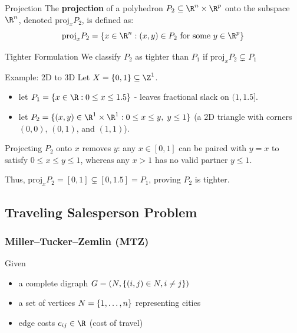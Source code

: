 \documentclass[a4paper, 11pt]{report}
\begin{document}
\begin{defframe}{Projection}{}
    The \textbf{projection} of a polyhedron $P_2 \subseteq \R^n \times \R^p$ onto the subspace $\R^n$, denoted $\text{proj}_x P_2$, is defined as:
    $$ \text{proj}_x P_2 = \{ x \in \R^n : (x,y) \in P_2 \text{ for some } y \in \R^p \} $$
\end{defframe}

\begin{defframe}{Tighter Formulation}{}
We classify $P_2$ as tighter than $P_1$ if $\text{proj}_{x} P_2 \subsetneq P_1$
\end{defframe}

\begin{gframe}{Example: 2D to 3D}
Let $X = \{0,1\} \subseteq \Z^1$.
\begin{itemize}
    \item let $P_1 = \{ x \in \R : 0 \le x \le 1.5 \}$ - leaves fractional slack on $(1, 1.5]$.
    \item let $P_2 = \{ (x,y) \in \R^1 \times \R^1 : 0 \le x \le y, \; y \le 1 \}$ (a 2D triangle with corners $(0,0)$, $(0,1)$, and $(1,1)$).
\end{itemize}
Projecting $P_2$ onto $x$ removes $y$: any $x \in [0,1]$ can be paired with $y = x$ to satisfy $0 \le x \le y \le 1$, whereas any $x > 1$ has no valid partner $y \le 1$. 

Thus, $\text{proj}_x P_2 = [0,1] \subsetneq [0, 1.5] = P_1$, proving $P_2$ is tighter.

\end{gframe}

\subsection{Traveling Salesperson Problem}

\subsubsection{Miller--Tucker--Zemlin (MTZ)}

Given

\begin{itemize}
    \item a complete digraph $G = (N, \set{(i,j) \in N, i \neq j})$
    \item a set of vertices $N = \set{1, \dots, n}$ representing cities
    \item edge costs $c_{ij} \in \R$ (cost of travel)
\end{itemize}
\end{document}
